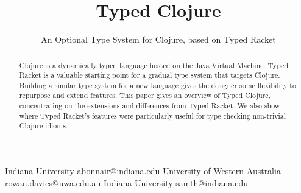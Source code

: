 \documentclass[preprint,10pt]{sigplanconf}
\begin{document}
\setlength{\pdfpageheight}{\paperheight}
\setlength{\pdfpagewidth}{\paperwidth}






\title{Typed Clojure}
\subtitle{An Optional Type System for Clojure, based on Typed Racket}

           {Indiana University}
           {abonnair@indiana.edu}
           {University of Western Australia}
           {rowan.davies@uwa.edu.au}
           {Indiana University}
           {samth@indiana.edu}

\maketitle

\begin{abstract}
Clojure is a dynamically typed language hosted on the Java 
Virtual Machine.
Typed Racket is a valuable starting point for
a gradual type system that targets Clojure.
Building a similar type system for a new language gives the
designer some flexibility to repurpose and extend features.
This paper gives an overview of Typed Clojure, concentrating
on the extensions and differences from Typed Racket. We also
show where Typed Racket's features were particularly useful
for type checking non-trivial Clojure idioms.
\end{abstract}


\end{document}
